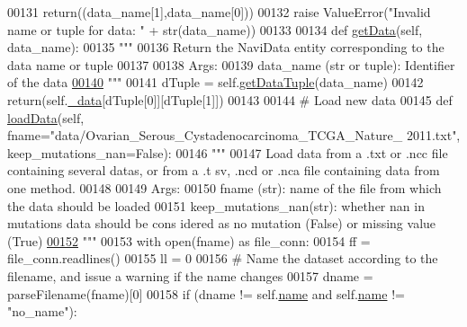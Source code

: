 \begin{DoxyCode}
00131                 \textcolor{keywordflow}{return}((data\_name[1],data\_name[0]))
00132         \textcolor{keywordflow}{raise} ValueError(\textcolor{stringliteral}{"Invalid name or tuple for data: "} + str(data\_name))
00133 
00134     \textcolor{keyword}{def }\hyperlink{classnavicom_1_1navicom_1_1NaviCom_ad675e899836271ff4f2fd4bd17ea81d9}{getData}(self, data\_name):
00135         \textcolor{stringliteral}{"""}
00136 \textcolor{stringliteral}{        Return the NaviData entity corresponding to the data name or tuple}
00137 \textcolor{stringliteral}{}
00138 \textcolor{stringliteral}{        Args:}
00139 \textcolor{stringliteral}{            data\_name (str or tuple): Identifier of the data}
\hypertarget{navicom_8py_source_l00140}{}\hyperlink{classnavicom_1_1navicom_1_1NaviCom_ad675e899836271ff4f2fd4bd17ea81d9}{00140} \textcolor{stringliteral}{        """}
00141         dTuple = self.\hyperlink{classnavicom_1_1navicom_1_1NaviCom_ad8ac5b74afb4ceb6ed094604787d4d19}{getDataTuple}(data\_name)
00142         \textcolor{keywordflow}{return}(self.\hyperlink{classnavicom_1_1navicom_1_1NaviCom_a407b2b5c30a5652ee85c4be54b3e6679}{_data}[dTuple[0]][dTuple[1]])
00143 
00144     \textcolor{comment}{# Load new data}
00145     \textcolor{keyword}{def }\hyperlink{classnavicom_1_1navicom_1_1NaviCom_a10e8b8a4c06b4ecf09366ca6b69efff6}{loadData}(self, fname="data/Ovarian\_Serous\_Cystadenocarcinoma\_TCGA\_Nature\_
      2011.txt", keep\_mutations\_nan=False):
00146         \textcolor{stringliteral}{"""}
00147 \textcolor{stringliteral}{        Load data from a .txt or .ncc file containing several datas, or from a .t
      sv, .ncd or .nca file containing data from one method.}
00148 \textcolor{stringliteral}{}
00149 \textcolor{stringliteral}{        Args:}
00150 \textcolor{stringliteral}{            fname (str): name of the file from which the data should be loaded}
00151 \textcolor{stringliteral}{            keep\_mutations\_nan(str): whether nan in mutations data should be cons
      idered as no mutation (False) or missing value (True)}
\hypertarget{navicom_8py_source_l00152}{}\hyperlink{classnavicom_1_1navicom_1_1NaviCom_a10e8b8a4c06b4ecf09366ca6b69efff6}{00152} \textcolor{stringliteral}{        """}
00153         with open(fname) \textcolor{keyword}{as} file\_conn:
00154             ff = file\_conn.readlines()
00155             ll = 0
00156         \textcolor{comment}{# Name the dataset according to the filename, and issue a warning if the 
      name changes}
00157         dname = parseFilename(fname)[0]
00158         \textcolor{keywordflow}{if} (dname != self.\hyperlink{classnavicom_1_1navicom_1_1NaviCom_a950e5ebf199edea40d55c506b8aaf134}{name} \textcolor{keywordflow}{and} self.\hyperlink{classnavicom_1_1navicom_1_1NaviCom_a950e5ebf199edea40d55c506b8aaf134}{name} != \textcolor{stringliteral}{"no\_name"}):

\end{DoxyCode}
